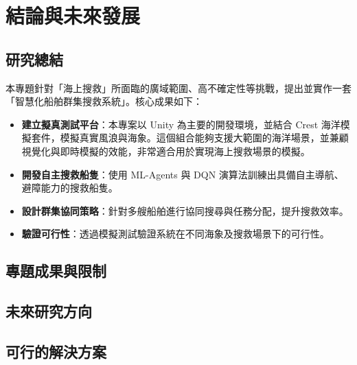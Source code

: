 \documentclass[12pt,a4paper]{article}
\begin{document}
\section{結論與未來發展}

\subsection{研究總結}
本專題針對「海上搜救」所面臨的廣域範圍、高不確定性等挑戰，提出並實作一套「智慧化船舶群集搜救系統」。核心成果如下：
\begin{itemize}
    \item \textbf{建立擬真測試平台}：本專案以 Unity 為主要的開發環境，並結合 Crest 海洋模擬套件，模擬真實風浪與海象。這個組合能夠支援大範圍的海洋場景，並兼顧視覺化與即時模擬的效能，非常適合用於實現海上搜救場景的模擬。
    \item \textbf{開發自主搜救船隻}：使用 ML-Agents 與 DQN 演算法訓練出具備自主導航、避障能力的搜救船隻。
    \item \textbf{設計群集協同策略}：針對多艘船舶進行協同搜尋與任務分配，提升搜救效率。
    \item \textbf{驗證可行性}：透過模擬測試驗證系統在不同海象及搜救場景下的可行性。
\end{itemize}

\subsection{專題成果與限制}

\subsection{未來研究方向}

\subsection{可行的解決方案}
\end{document}
